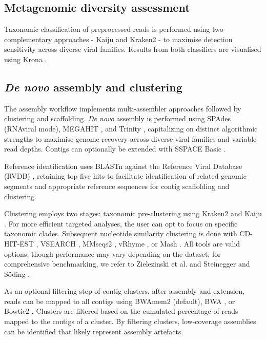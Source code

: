 \subsection{Metagenomic diversity assessment}

Taxonomic classification of preprocessed reads is performed using two complementary approaches - Kaiju \cite{Menzel2016-tz} and Kraken2 \cite{Wood2019-jl} - to maximise detection sensitivity across diverse viral families. Results from both classifiers are visualised using Krona \cite{Ondov2011-yp}.

\subsection{{\it De novo} assembly and clustering}

The assembly workflow implements multi-assembler approaches followed by clustering and scaffolding. \textit{De novo} assembly is performed using SPAdes \cite{Meleshko2021-gb} (RNAviral mode), MEGAHIT \cite{Li2016-sd}, and Trinity \cite{Grabherr2011-ef}, capitalizing on distinct algorithmic strengths to maximise genome recovery across diverse viral families and variable read depths. Contigs can optionally be extended with SSPACE Basic \cite{Boetzer2011-dh}.

Reference identification uses BLASTn \cite{Altschul1990-sy} against the Reference Viral Database (RVDB) \cite{Goodacre2018-dw}, retaining top five hits to facilitate identification of related genomic segments and appropriate reference sequences for contig scaffolding and clustering.

Clustering employs two stages: taxonomic pre-clustering using Kraken2 \cite{Wood2019-jl} and Kaiju \cite{Menzel2016-tz}. For more efficient targeted analyses, the user can opt to focus on specific taxonomic clades. Subsequent nucleotide similarity clustering is done with CD-HIT-EST \cite{Li2006-nj}, VSEARCH \cite{Rognes2016-ju}, MMseqs2 \cite{Steinegger2017-ci}, vRhyme \cite{Kieft2022-km}, or Mash \cite{Ondov2019-bo}. All tools are valid options, though performance may vary depending on the dataset; for comprehensive benchmarking, we refer to Zielezinski et al. \cite{Zielezinski2025-vl} and Steinegger and Söding \cite{Steinegger2017-ci}.

As an optional filtering step of contig clusters, after assembly and extension, reads can be mapped to all contigs using BWAmem2 \cite{Vasimuddin2019-rb} (default), BWA \cite{Li2013-pp}, or Bowtie2 \cite{Langmead2019-wx}. Clusters are filtered based on the cumulated percentage of reads mapped to the contigs of a cluster. By filtering clusters, low-coverage assemblies can be identified that likely represent assembly artefacts.

